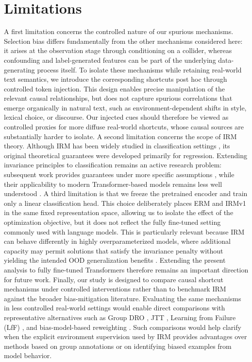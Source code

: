 \documentclass[11pt]{article}
\theoremstyle{definition}
\theoremstyle{plain}
\begin{document}
\section*{Limitations}

A first limitation concerns the controlled nature of our spurious mechanisms. Selection bias differs fundamentally from the other mechanisms considered here: it arises at the observation stage through conditioning on a collider, whereas confounding and label-generated features can be part of the underlying data-generating process itself. To isolate these mechanisms while retaining real-world text semantics, we introduce the corresponding shortcuts post hoc through controlled token injection. This design enables precise manipulation of the relevant causal relationships, but does not capture spurious correlations that emerge organically in natural text, such as environment-dependent shifts in style, lexical choice, or discourse. Our injected cues should therefore be viewed as controlled proxies for more diffuse real-world shortcuts, whose causal sources are substantially harder to isolate. A second limitation concerns the scope of IRM theory. Although IRM has been widely studied in classification settings \citep{arjovsky2019invariant, ahuja2020invariant, choe2020empirical, kamath2021does}, its original theoretical guarantees were developed primarily for regression. Extending invariance principles to classification remains an active research problem: subsequent work provides guarantees under more specific assumptions \citep{ahuja2021invariance}, while their applicability to modern Transformer-based models remains less well understood \citep{peyrard2022invariant}. A third limitation is that we freeze the pretrained encoder and train only a linear classification head. This choice deliberately places ERM and IRMv1 in the same fixed representation space, allowing us to isolate the effect of the optimization objective, but it does not reflect the fully fine-tuned setting commonly used with language models. This is particularly relevant because IRM can behave differently in highly overparameterized models, where additional capacity may permit solutions that satisfy the invariance penalty without yielding the intended OOD generalization benefits \citep{rosenfeld2020risks, gulrajani2020search}. Extending the present analysis to fully fine-tuned Transformers therefore remains an important direction for future work. Finally, our study is designed to compare causal shortcut mechanisms under controlled interventions rather than to benchmark IRM against the broader bias-mitigation literature. Evaluating the same mechanisms in less controlled real-world settings would enable direct comparisons with representative alternatives such as Group DRO \citep{sagawa2019distributionally}, JTT \citep{liu2021just}, Learning from Failure (LfF) \citep{nam2020learning}, and bias-model-based reweighting \citep{utama2020towards}. Such comparisons would help clarify when the explicit environment supervision used by IRM provides advantages over methods based on group annotations or on identifying biased examples from model behavior.
\end{document}
